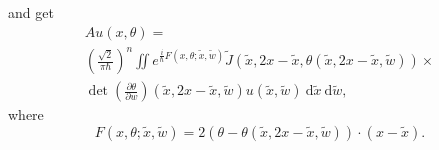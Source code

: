 \documentclass{article}
\newcommand{\DD}{\:\!\mathrm{d}}
\newcommand{\h}{\hbar}
\begin{document}
and get
\begin{multline}
  \label{dsa.10}
  Au(x,\theta )=\\
  \left(\frac{\sqrt{2}}{\pi \h} \right)^n \iint
  e^{\frac{i}{\h}F(x,\theta ;\widetilde{x},\widetilde{w})}
  \widetilde{J}(\widetilde{x},2x-\widetilde{x},\theta
  (\widetilde{x},2x-\widetilde{x},\widetilde{w}))\times \\
  \det \left(\frac{\partial \theta }{\partial w} \right)
  (\widetilde{x},2x-\widetilde{x},\widetilde{w})
  u(\widetilde{x},\widetilde{w}) \DD\widetilde{x}\DD\widetilde{w},
\end{multline}
where
\begin{equation}\label{dsa.11}
  F(x,\theta ;\widetilde{x},\widetilde{w})=2(\theta -\theta
  (\widetilde{x},2x-\widetilde{x},\widetilde{w}))\cdot (x-\widetilde{x}).
\end{equation}
\end{document}
